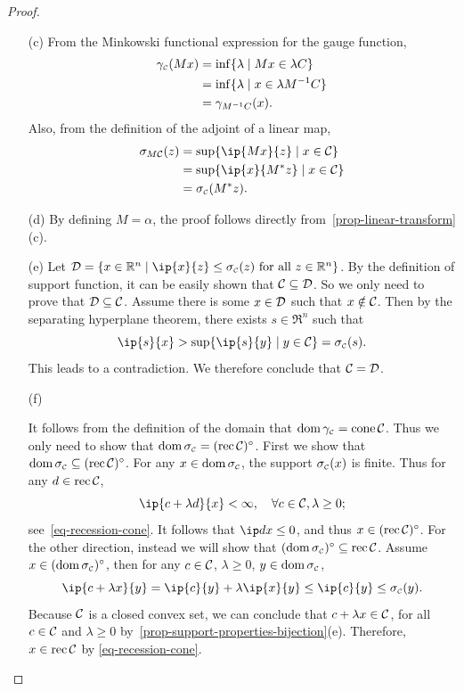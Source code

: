 \begin{proof}
\begin{itemize}
  \item[(c)]
    From the Minkowski functional expression for the gauge function, 
    \begin{align*}
      \gamma_{\scriptscriptstyle\mathcal{C}}(Mx) &= \inf\{\lambda \mid Mx \in \lambda C\}
      \\&= \inf\{\lambda \mid x \in \lambda M^{-1}C\}
      \\&= \gamma_{M^{-1}C}(x).
    \end{align*}
    Also, from the definition of the adjoint of a linear map,
    \begin{align*}
      \sigma_{M\Cscr}(z) &= \sup\{\ip{M x}{z} \mid x \in \Cscr\}
      \\&= \sup\{\ip{x}{M^* z} \mid x \in \Cscr\}
      \\&= \sigma\Cs(M^* z).
    \end{align*}
  
  \item[(d)]
    By defining $M = \alpha$, the proof follows directly from~\autoref{prop-linear-transform}(c). 
  
  \item[(e)]Let
    $\Dscr = \{x\in\Re^n \mid \ip{x}{z} \leq \sigma\Cs(z) \mbox{\ for
        all\ } z \in\Re^n\}$. By the definition of support function, it
    can be easily shown that $\mathcal{C} \subseteq \mathcal{D}$. So we only need to
    prove that $\mathcal{D} \subseteq \mathcal{C}$.  Assume there is some
    $x \in \mathcal{D}$ such that $x \notin \mathcal{C}$. Then by the separating
    hyperplane theorem, there exists $s \in \Re^n$ such that
  \[\ip{s}{x} > \sup\{\ip{s}{y} \mid y \in \Cscr\} = \sigma\Cs(s).\]
  This leads to a contradiction. We therefore conclude that $\mathcal{C} = \mathcal{D}$.
  
  \item[(f)]
  
    It follows from the definition of the domain that $\operatorname{dom}\gamma_{\scriptscriptstyle\mathcal{C}} =
    \operatorname{cone}\mathcal{C}$. Thus we only need to show that $\operatorname{dom}\sigma_{\scriptscriptstyle\mathcal{C}}=(\operatorname{rec}\mathcal{C})^\circ$.
    First we show that $\operatorname{dom}\sigma_{\scriptscriptstyle\mathcal{C}} \subseteq (\operatorname{rec}\mathcal{C})^\circ$. For any $x \in
    \operatorname{dom}\sigma_{\scriptscriptstyle\mathcal{C}}$, the support $\sigma_{\scriptscriptstyle\mathcal{C}}(x)$ is finite. Thus for any $d \in
    \operatorname{rec}\mathcal{C}$,
    \[\ip{c + \lambda d}{x} < \infty, \quad \forall c \in \Cscr, \lambda
      \geq 0;\] see~\eqref{eq-recession-cone}. It follows that $\ip d x \leq 0$, and thus
    $x \in (\operatorname{rec}\mathcal{C})^\circ$. For the other direction, instead we will
    show that $(\operatorname{dom}\sigma_{\scriptscriptstyle\mathcal{C}})^\circ \subseteq \operatorname{rec}\mathcal{C}$. Assume
    $x \in (\operatorname{dom}\sigma_{\scriptscriptstyle\mathcal{C}})^\circ$, then for any $c \in \mathcal{C}$,
    $\lambda \geq 0$, $y \in \operatorname{dom}\sigma_{\scriptscriptstyle\mathcal{C}}$,
    \[
      \ip{c + \lambda x}{y} = \ip{c}{y} + \lambda\ip{x}{y} \leq
      \ip{c}{y} \leq \sigma\Cs(y).
    \]
    Because $\mathcal{C}$ is a closed convex set, we can conclude that $c + \lambda x
    \in \mathcal{C}$, for all $c \in \mathcal{C}$ and $\lambda \geq 0$
    by~\autoref{prop-support-properties-bijection}(e). Therefore, $x \in \operatorname{rec}\mathcal{C}$ by
    \eqref{eq-recession-cone}.
    

\end{itemize}
\end{proof}
